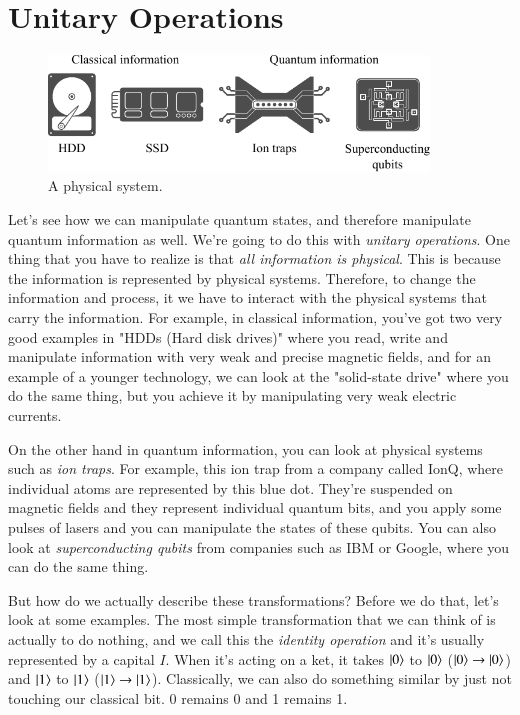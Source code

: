 \section{Unitary Operations}


\begin{figure}[H]
    \centering
    \includegraphics[width=0.9\textwidth]{lesson2/2-2_classical_quantum_info.pdf}
        \caption{A physical system.}
    \label{fig:physical-system}
\end{figure}

Let's see how we can manipulate quantum states, and therefore manipulate quantum information as well. We're going to do this with \emph{unitary operations}. One thing that you have to realize is that \emph{all information is physical}. This is because the information is represented by physical systems. Therefore, to change the information and process, it we have to interact with the physical systems that carry the information. For example, in classical information, you've got two very good examples in "HDDs (Hard disk drives)" where you read, write and manipulate information with very weak and precise magnetic fields, and for an example of a younger technology, we can look at the "solid-state drive" where you do the same thing, but you achieve it by manipulating very weak electric currents.

On the other hand in quantum information, you can look at physical systems such as \emph{ion traps}. For example, this ion trap from a company called IonQ, where individual atoms are represented by this blue dot. They're suspended on magnetic fields and they represent individual quantum bits, and you apply some pulses of lasers and you can manipulate the states of these qubits.  You can also look at \emph{superconducting qubits} from companies such as IBM or Google, where you can do the same thing. 

But how do we actually describe these transformations? Before we do that, let's look at some examples. The most simple transformation that we can think of is actually to do nothing, and we call this the \emph{identity operation} and it's usually represented by a capital $I$. When it's acting on a ket, it takes $\ket{0}$ to  $\ket{0}$  ($\ket{0}\rightarrow\ket{0}$) and $\ket{1}$ to $\ket{1}$ ($\ket{1}\rightarrow\ket{1}$). Classically, we can also do something similar by just not touching our classical bit. 0 remains 0 and 1 remains 1.

